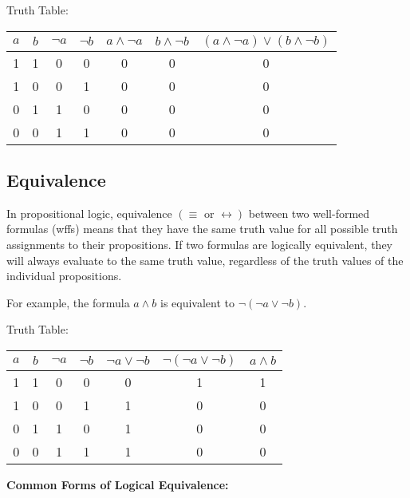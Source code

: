 \documentclass[12pt,a4paper,openany]{article}
\begin{document}
Truth Table:

\begin{center}
\begin{tabular}{|c|c|c|c|c|c|c|}
\hline
\(a\) & \(b\) & \(\neg a\) & \(\neg b\) & \(a \land \neg a\) & \(b \land \neg b\) & \((a \land \neg a) \lor (b \land \neg b)\) \\
\hline
1 & 1 & 0 & 0 & 0 & 0 & 0 \\
1 & 0 & 0 & 1 & 0 & 0 & 0 \\
0 & 1 & 1 & 0 & 0 & 0 & 0 \\
0 & 0 & 1 & 1 & 0 & 0 & 0 \\
\hline
\end{tabular}
\end{center}

\subsection{Equivalence}\label{equivalence}

In propositional logic, equivalence
\((\equiv \text{ or } \leftrightarrow)\) between two well-formed
formulas (wffs) means that they have the same truth value for all
possible truth assignments to their propositions. If two formulas are
logically equivalent, they will always evaluate to the same truth value,
regardless of the truth values of the individual propositions.

For example, the formula \(a \land b\) is equivalent to
\(\neg(\neg a \lor \neg b)\).

Truth Table:

\begin{center}
\begin{tabular}{|c|c|c|c|c|c|c|}
\hline
\(a\) & \(b\) & \(\neg a\) & \(\neg b\) & \(\neg a \lor \neg b\) & \(\neg(\neg a \lor \neg b)\) & \(a \land b\) \\
\hline
1 & 1 & 0 & 0 & 0 & 1 & 1 \\
1 & 0 & 0 & 1 & 1 & 0 & 0 \\
0 & 1 & 1 & 0 & 1 & 0 & 0 \\
0 & 0 & 1 & 1 & 1 & 0 & 0 \\
\hline
\end{tabular}
\end{center}

\textbf{Common Forms of Logical Equivalence: }
\end{document}
